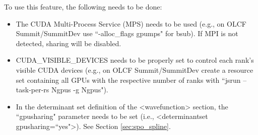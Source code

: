 To use this feature, the following needs to be done:

\begin{itemize}
    \item The CUDA Multi-Process Service (MPS) needs to be used
      (e.g., on OLCF Summit/SummitDev use ``-alloc\_flags gpumps" for
      bsub). If MPI is not detected, sharing will be disabled.
    \item CUDA\_VISIBLE\_DEVICES needs to be properly set to control each
      rank's visible CUDA devices (e.g., on OLCF Summit/SummitDev create a resource set containing all GPUs with the
      respective number of ranks with ``jsrun --task-per-rs Ngpus -g
      Ngpus").
    \item In the determinant set definition of the <wavefunction>
      section, the ``gpusharing" parameter needs to be set
      (i.e., <determinantset gpusharing=``yes">). See Section \ref{sec:spo_spline}.
\end{itemize}
